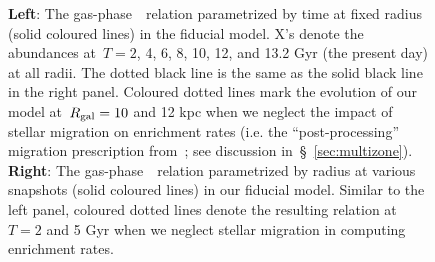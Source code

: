 \documentclass[ms.tex]{subfiles}
\begin{document}
\begin{figure}
\caption{
\textbf{Left}: The gas-phase~\ohno~relation parametrized by time at
fixed radius (solid coloured lines) in the fiducial model. X's denote the
abundances at~$T = 2$, 4, 6, 8, 10, 12, and 13.2 Gyr (the present day) at all
radii.
The dotted black line is the same as the solid black line in the right panel.
Coloured dotted lines mark the evolution of our model at~$R_\text{gal} = 10$ and 12
kpc when we neglect the impact of stellar migration on enrichment rates (i.e.
the ``post-processing'' migration prescription from~\citealp{Johnson2021}; see
discussion in~\S~\ref{sec:multizone}).
\textbf{Right}: The gas-phase~\ohno~relation parametrized by radius at
various snapshots (solid coloured lines) in our fiducial model.
Similar to the left panel, coloured dotted lines denote the resulting relation
at~$T = 2$ and 5 Gyr when we neglect stellar migration in computing enrichment
rates.
}
\label{fig:no_oh_timeevol}
\end{figure}
\end{document}
